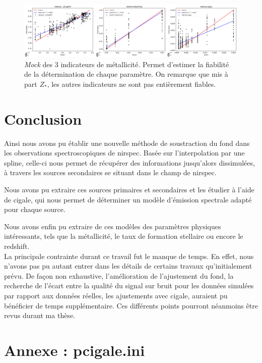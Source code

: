 \documentclass[12pt, a4paper]{article}
\begin{document}
\begin{figure}[!h]
  \centering
  \includegraphics[width=1\textwidth]{assets/mock_metallicity.png}
  \caption{\textit{Mock} des 3 indicateurs de métallicité. Permet d'estimer la fiabilité de la détermination de chaque paramètre. On remarque que mis à part $Z_*$, les autres indicateurs ne sont pas entièrement fiables.}
  \label{fig:mock_metallicity}
\end{figure}


\section{Conclusion}

Ainsi nous avons pu établir une nouvelle méthode de soustraction du fond dans les observations spectroscopiques de \gls{nirspec}. Basée sur l'interpolation par une spline, celle-ci nous permet de récupérer des informations jusqu'alors dissimulées, à travers les sources secondaires se situant dans le champ de \gls{nirspec}.

Nous avons pu extraire ces sources primaires et secondaires et les étudier à l'aide de \gls{cigale}, qui nous permet de déterminer un modèle d'émission spectrale adapté pour chaque source.

Nous avons enfin pu extraire de ces modèles des paramètres physiques intéressants, tels que la métallicité, le taux de formation stellaire ou encore le redshift.\\

La principale contrainte durant ce travail fut le manque de temps. En effet, nous n'avons pas pu autant entrer dans les détails de certains travaux qu'initialement prévu. De façon non exhaustive, l'amélioration de l'ajustement du fond, la recherche de l'écart entre la qualité du signal sur bruit pour les données simulées par rapport aux données réelles, les ajustements avec \gls{cigale}, auraient pu bénéficier de temps supplémentaire. Ces différents points pourront néanmoins être revus durant ma thèse.

\newpage

\printnoidxglossaries

\newpage

\printbibliography %

\newpage

\section{Annexe : pcigale.ini}
\label{pcigale.ini}


\end{document}
